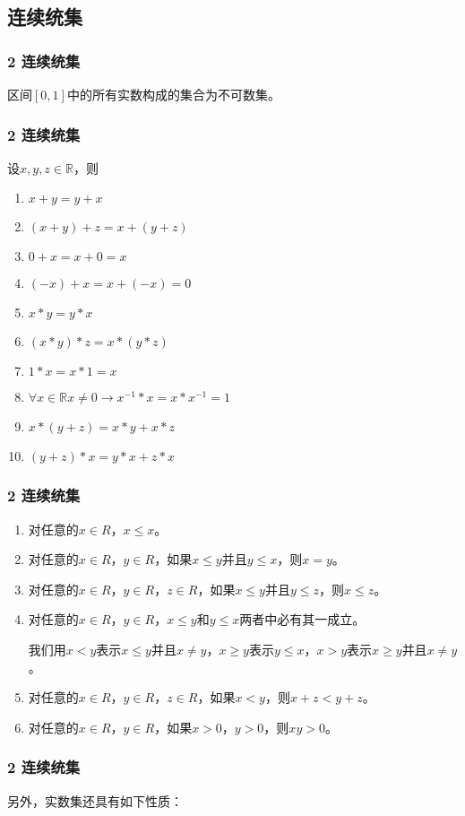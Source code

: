\documentclass{beamer}
\begin{document}
\begin{CJK*}{UTF8}{gbsn}
\section{连续统集}
\begin{frame}[t]
  \frametitle{2 连续统集}
  \begin{Thm}
    区间$[0,1]$中的所有实数构成的集合为不可数集。
  \end{Thm}
\end{frame}
\begin{frame}[t]
  \frametitle{2 连续统集}
   设$x, y, z \in \mathbb{R}$，则
   \begin{enumerate}
   \item   $x + y = y + x$
   \item   $(x + y) + z = x + (y + z)$
   \item   $0 + x = x + 0 = x$
   \item   $(-x) + x = x + (-x) = 0$
   \item   $x * y = y * x$
   \item   $(x * y) * z = x * (y *z)$
   \item   $1 * x = x * 1 = x$
   \item   $\forall x \in \mathbb{R} x \neq 0 \to x^{-1} * x = x * x^{-1} = 1$
   \item   $x* (y + z) = x * y + x * z$
   \item   $(y + z) * x = y * x + z * x$
    \end{enumerate}
  \end{frame}
  \begin{frame}[t]
  \frametitle{2 连续统集}
    \begin{enumerate}
      \item 对任意的$x\in R$，$x\leq x$。
      \item 对任意的$x\in R$，$y\in R$，如果$x\leq y$并且$y\leq x$，则$x=y$。 
     \item 对任意的$x\in R$，$y\in R$，$z\in R$，如果$x\leq y$并且$y\leq z$，则$x\leq z$。
     \item 对任意的$x\in R$，$y\in R$，$x\leq y$和$y\leq x$两者中必有其一成立。
     
     我们用$x<y$表示$x\leq y$并且$x\neq y$，$x\geq y$表示$y\leq x$，$x > y$表示$x\geq y$并且$x\neq y$。
     
     \item 对任意的$x\in R$，$y\in R$，$z\in R$，如果$x<y$，则$x+z<y+z$。
     \item 对任意的$x\in R$，$y\in R$，如果$x>0$，$y>0$，则$xy>0$。 
  \end{enumerate}
\end{frame}
\begin{frame}[t]
  \frametitle{2 连续统集}
    另外，实数集还具有如下性质：


\end{frame}
\end{CJK*}
\end{document}
